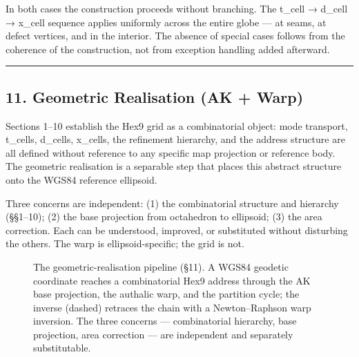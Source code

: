 \documentclass[
  11pt,
  a4paper,
]{article}
\begin{document}
In both cases the construction proceeds without branching. The t\_cell →
d\_cell → x\_cell sequence applies uniformly across the entire globe ---
at seams, at defect vertices, and in the interior. The absence of
special cases follows from the coherence of the construction, not from
exception handling added afterward.

\begin{center}\rule{0.5\linewidth}{0.5pt}\end{center}

\subsection{11. Geometric Realisation (AK +
Warp)}\label{geometric-realisation-ak-warp}

Sections 1--10 establish the Hex9 grid as a combinatorial object: mode
transport, t\_cells, d\_cells, x\_cells, the refinement hierarchy, and
the address structure are all defined without reference to any specific
map projection or reference body. The geometric realisation is a
separable step that places this abstract structure onto the WGS84
reference ellipsoid.

Three concerns are independent: (1) the combinatorial structure and
hierarchy (§§1--10); (2) the base projection from octahedron to
ellipsoid; (3) the area correction. Each can be understood, improved, or
substituted without disturbing the others. The warp is
ellipsoid-specific; the grid is not.

\begin{figure}[h]
\centering
{}
\caption{The geometric-realisation pipeline (\S11). A WGS84 geodetic coordinate
reaches a combinatorial Hex9 address through the AK base projection, the authalic
warp, and the partition cycle; the inverse (dashed) retraces the chain with a
Newton--Raphson warp inversion. The three concerns --- combinatorial hierarchy,
base projection, area correction --- are independent and separately substitutable.}
\end{figure}
\end{document}
